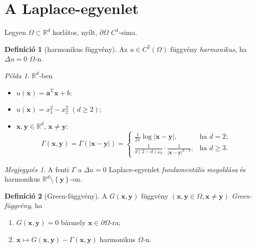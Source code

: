 \documentclass[%
	DIV=15,appendixprefix]{scrreprt}
\theoremstyle{definition}
\newtheorem*{defin}{Definíció}
\theoremstyle{remark}
\newtheorem*{megj}{Megjegyzés}
\newtheorem*{pelda}{Példa}
\DeclareMathOperator{\T}{T}
\begin{document}
\section{A Laplace-egyenlet}
%
Legyen $ \Omega \subset \mathbb{ R }^{ d } $ korlátos, nyílt, $ \partial \Omega $ $ C^{ 1 } $-sima.
\begin{defin}[harmonikus függvény]
Az $ u \in C^{ 2 } \left( \Omega \right) $ függvény \emph{harmonikus}, ha $ \Delta u = 0 $
$ \Omega $-n.
\end{defin}
\begin{pelda}
	$\mathbb{R}^{d}$-ben
	\begin{itemize}
		\item $ u \left( \mathbf{ x } \right) = \mathbf{ a }^{ \T } \mathbf{ x } + b $;
		\item $ u \left( \mathbf{ x } \right) = x_{ 1 }^{ 2 } - x_{ 2 }^{ 2 } $ $ \left( d \ge 2
			\right) $;
		\item $ \mathbf{ x },{} \mathbf{ y } \in \mathbb{ R }^{ d } $, $ \mathbf{ x } \neq
			\mathbf{ y } $:
			\begin{equation*}
				\Gamma \left( \mathbf{ x },{} \mathbf{ y } \right) = \Gamma \left( \left|
				\mathbf{ x } - \mathbf{ y } \right| \right) = \begin{cases}
					\frac{ 1 }{ 2 \pi } \log \left| \mathbf{ x } - \mathbf{ y } \right|, &
						\text{ha } d = 2;\\
					\frac{ 1 }{ d \left( 2 - d \right) \omega_{ d } } \cdot \frac{ 1 }{ \left|
						\mathbf{ x } - \mathbf{ y } \right|^{ d - 2 } }, & \text{ha } d \ge 3.
				\end{cases}
			\end{equation*}
	\end{itemize}
\end{pelda}
\begin{megj}
	A fenti $ \Gamma $ a $ \Delta u = 0$ Laplace-egyenlet \emph{fundamentális megoldása} és
	harmonikus $ \mathbb{ R }^{ d } \setminus \left\{ \mathbf{ y } \right\} $-on.
\end{megj}
%
\begin{defin}[Green-függvény]
	A $ G \left( \mathbf{ x },{} \mathbf{ y } \right) $ függvény $ \left( \mathbf{ x },{}
	\mathbf{ y } \in \Omega,{} \mathbf{ x } \neq \mathbf{ y } \right) $ \emph{Green-függvény}, ha
	\begin{enumerate}
		\item $ G \left( \mathbf{ x },{} \mathbf{ y } \right) = 0 $ bármely $ \mathbf{ x } \in
			\partial \Omega $-ra;
		\item $ \mathbf{ x } \mapsto G \left( \mathbf{ x },{} \mathbf{ y } \right) - \Gamma \left(
			\mathbf{ x },{} \mathbf{ y } \right) $ harmonikus $\Omega$-n.
	\end{enumerate}
\end{defin}
\end{document}
